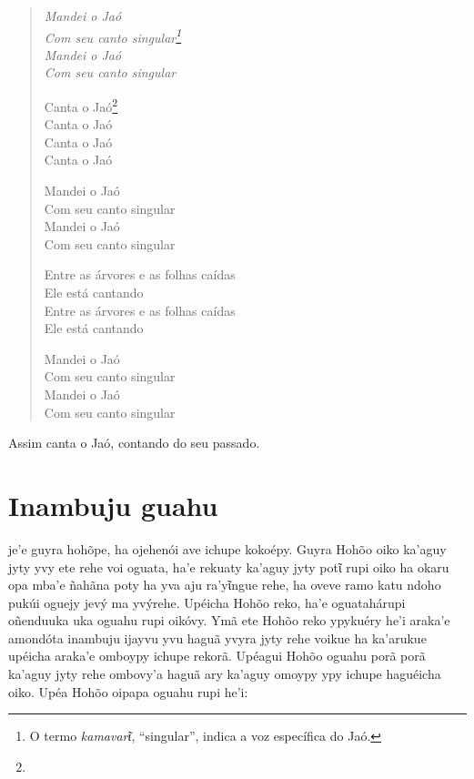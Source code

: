 \begin{verse}
\itshape
Mandei o Jaó\\
Com seu canto singular\footnote{O termo \emph{kamavarῖ}, ``singular'', indica a voz específica do Jaó.}\\
Mandei o Jaó\\
Com seu canto singular

Canta o Jaó\footnote{}\\
Canta o Jaó\\
Canta o Jaó\\
Canta o Jaó

Mandei o Jaó\\
Com seu canto singular\\
Mandei o Jaó\\
Com seu canto singular

Entre as árvores e as folhas caídas\\
Ele está cantando\\
Entre as árvores e as folhas caídas\\
Ele está cantando

Mandei o Jaó\\
Com seu canto singular\\
Mandei o Jaó\\
Com seu canto singular
\end{verse}

Assim canta o Jaó, contando do seu passado.

\chapter{Inambuju guahu}

 je'e guyra hohõpe, ha ojehenói ave ichupe kokoépy. Guyra Hohõo
oiko ka'aguy jyty yvy ete rehe voi oguata, ha'e rekuaty ka'aguy jyty
potῖ rupi oiko ha okaru opa mba'e ñahãna poty ha yva aju ra'yῖngue rehe,
ha oveve ramo katu ndoho pukúi oguejy jevý ma yvýrehe. Upéicha Hohõo
reko, ha'e oguatahárupi oñenduuka uka oguahu rupi oikóvy. Ymã ete Hohõo
reko ypykuéry he'i araka'e amondóta inambuju ijayvu yvu haguã yvyra jyty
rehe voikue ha ka'arukue upéicha araka'e omboypy ichupe rekorã. Upéagui
Hohõo oguahu porã porã ka'aguy jyty rehe ombovy'a haguã ary ka'aguy
omoypy ypy ichupe haguéicha oiko. Upéa Hohõo oipapa oguahu rupi he'i:

